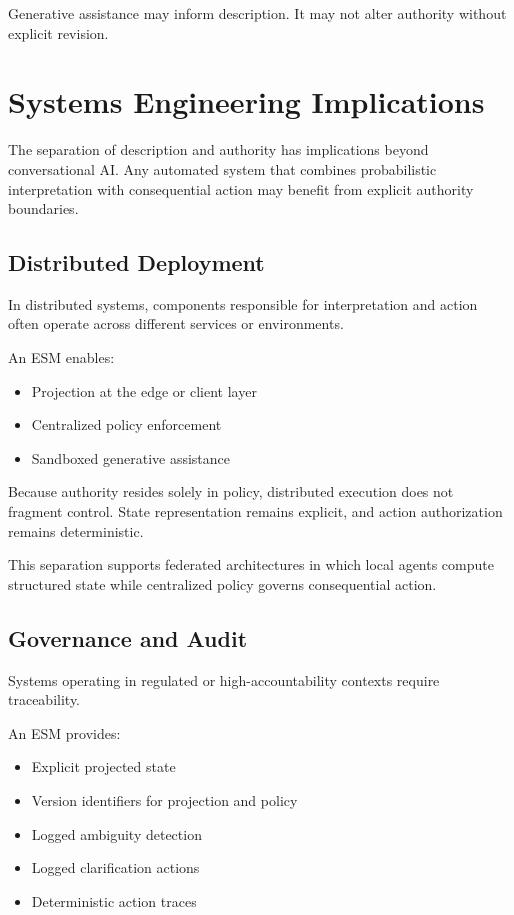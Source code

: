 \documentclass[11pt]{article}
\begin{document}
Generative assistance may inform description. It may not alter authority without explicit revision.

\section{Systems Engineering Implications}

The separation of description and authority has implications beyond conversational AI. Any automated system that combines probabilistic interpretation with consequential action may benefit from explicit authority boundaries.

\subsection{Distributed Deployment}

In distributed systems, components responsible for interpretation and action often operate across different services or environments.

An ESM enables:

\begin{itemize}
  \item Projection at the edge or client layer
  \item Centralized policy enforcement
  \item Sandboxed generative assistance
\end{itemize}

Because authority resides solely in policy, distributed execution does not fragment control. State representation remains explicit, and action authorization remains deterministic.

This separation supports federated architectures in which local agents compute structured state while centralized policy governs consequential action.


\subsection{Governance and Audit}

Systems operating in regulated or high-accountability contexts require traceability.

An ESM provides:

\begin{itemize}
  \item Explicit projected state
  \item Version identifiers for projection and policy
  \item Logged ambiguity detection
  \item Logged clarification actions
  \item Deterministic action traces
\end{itemize}
\end{document}
